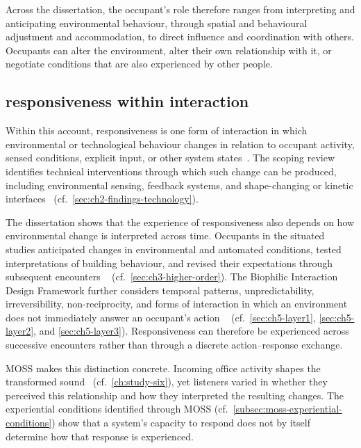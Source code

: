 Across the dissertation, the occupant's role therefore ranges from interpreting and anticipating environmental behaviour, through spatial and behavioural adjustment and accommodation, to direct influence and coordination with others. Occupants can alter the environment, alter their own relationship with it, or negotiate conditions that are also experienced by other people.


\subsection{responsiveness within interaction}
\label{subsec:responsiveness-form-interaction}

Within this account, responsiveness is one form of interaction in which
environmental or technological behaviour changes in relation to
occupant activity, sensed conditions, explicit input, or other system
states~\cite{vallgaarda2014dress,nguyen2022responsive}. The scoping
review identifies technical interventions through which such change can
be produced, including environmental sensing, feedback systems, and
shape-changing or kinetic interfaces~\cite{rao2025smart}
(cf.~\autoref{sec:ch2-findings-technology}).

The dissertation shows that the experience of responsiveness also
depends on how environmental change is interpreted across time.
Occupants in the situated studies anticipated changes in environmental
and automated conditions, tested interpretations of building behaviour,
and revised their expectations through subsequent encounters
~\cite{rao2026emotion}
(cf.~\autoref{sec:ch3-higher-order}). The Biophilic Interaction Design
Framework further considers temporal patterns, unpredictability,
irreversibility, non-reciprocity, and forms of interaction in which an
environment does not immediately answer an occupant's action
~\cite{rao2026biophilic}
(cf.~\autoref{sec:ch5-layer1},
\autoref{sec:ch5-layer2}, and
\autoref{sec:ch5-layer3}). Responsiveness can therefore be experienced
across successive encounters rather than through a discrete
action--response exchange.

MOSS makes this distinction concrete. Incoming office activity shapes
the transformed sound~\cite{rao2027biophilic}
(cf.~\autoref{ch:study-six}), yet listeners varied in whether they
perceived this relationship and how they interpreted the resulting
changes. The experiential conditions identified through MOSS
(cf.~\autoref{subsec:moss-experiential-conditions}) show that a
system's capacity to respond does not by itself determine how that
response is experienced.

